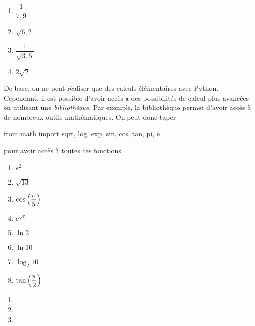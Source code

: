 \begin{multicols}{4}
  \begin{enumerate}[label=\emph{\alph*)}]
    \item $\dfrac{1}{7,9}$
    \item $\sqrt{6,2}$
    \item $\dfrac{1}{\sqrt{3,5}}$
    \item $2\sqrt{2}$
  \end{enumerate}
\end{multicols}
De base, on ne peut réaliser que des calculs élémentaires avec Python. Cependant, il est possible d'avoir accès à des possibilités de calcul plus avancées en utilisant une \emph{bibliothèque}. 
Par exemple, la bibliothèque  permet d'avoir accès à de nombreux outils mathématiques. 
On peut donc taper
\begin{pyverbatim}
  from math import sqrt, log, exp, sin, cos, tan, pi, e 
\end{pyverbatim}
pour avoir accès à toutes ces fonctions. \\

\begin{multicols}{4}
  \begin{enumerate}[label=\emph{\alph*)}]
    \item $e^2$
    \item $\sqrt{13}$
    \item $\cos\left(\dfrac{\pi}{5}\right)$
    \item $e^{\sqrt{5}}$
    \item $\ln 2$
    \item $\ln 10$
    \item $\log_{2} 10$
    \item $\tan\left(\dfrac{\pi}{2}\right)$
  \end{enumerate}
\end{multicols}


\begin{multicols}{3}
  \begin{enumerate}[label=\emph{\alph*)}]
    \item {}
    \item {}
    \item {}
  \end{enumerate}
\end{multicols}

